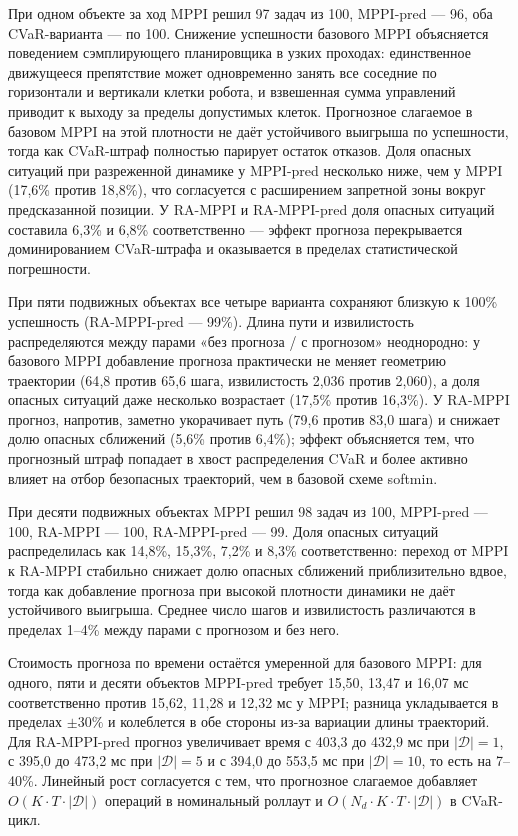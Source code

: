 \documentclass[a4paper,12pt]{extarticle}
\begin{document}
    При одном объекте за ход MPPI решил 97 задач из 100, MPPI-pred --- 96, оба CVaR-варианта
    --- по 100. Снижение успешности базового MPPI объясняется поведением сэмплирующего
    планировщика в узких проходах: единственное движущееся препятствие может одновременно занять все
    соседние по горизонтали и вертикали клетки робота, и взвешенная сумма управлений приводит к
    выходу за пределы допустимых клеток. Прогнозное слагаемое в базовом MPPI на этой
    плотности не даёт устойчивого выигрыша по успешности, тогда как CVaR-штраф полностью
    парирует остаток отказов. Доля опасных ситуаций при разреженной динамике
    у MPPI-pred несколько ниже, чем у MPPI (17{,}6\% против 18{,}8\%), что согласуется
    с расширением запретной зоны вокруг предсказанной позиции. У RA-MPPI и RA-MPPI-pred
    доля опасных ситуаций составила 6{,}3\% и 6{,}8\% соответственно --- эффект прогноза
    перекрывается доминированием CVaR-штрафа и оказывается в пределах статистической погрешности.

    При пяти подвижных объектах все четыре варианта сохраняют близкую к 100\% успешность
    (RA-MPPI-pred --- 99\%). Длина пути и извилистость распределяются между парами
    «без прогноза / с прогнозом» неоднородно: у базового MPPI добавление прогноза
    практически не меняет геометрию траектории (64{,}8 против 65{,}6 шага, извилистость
    2{,}036 против 2{,}060), а доля опасных ситуаций даже несколько возрастает
    (17{,}5\% против 16{,}3\%). У RA-MPPI прогноз, напротив, заметно укорачивает путь
    (79{,}6 против 83{,}0 шага) и снижает долю опасных сближений (5{,}6\% против 6{,}4\%);
    эффект объясняется тем, что прогнозный штраф попадает в хвост распределения CVaR
    и более активно влияет на отбор безопасных траекторий, чем в базовой схеме softmin.

    При десяти подвижных объектах MPPI решил 98 задач из 100, MPPI-pred --- 100,
    RA-MPPI --- 100, RA-MPPI-pred --- 99. Доля опасных ситуаций распределилась как
    14{,}8\%, 15{,}3\%, 7{,}2\% и 8{,}3\% соответственно: переход от MPPI к RA-MPPI
    стабильно снижает долю опасных сближений приблизительно вдвое, тогда как добавление
    прогноза при высокой плотности динамики не даёт устойчивого выигрыша.
    Среднее число шагов и извилистость различаются в пределах 1--4\% между парами
    с прогнозом и без него.

    Стоимость прогноза по времени остаётся умеренной для базового MPPI: для одного,
    пяти и десяти объектов MPPI-pred требует 15{,}50, 13{,}47 и 16{,}07 мс соответственно
    против 15{,}62, 11{,}28 и 12{,}32 мс у MPPI; разница укладывается в пределах
    $\pm 30\%$ и колеблется в обе стороны из-за вариации длины траекторий.
    Для RA-MPPI-pred прогноз увеличивает время с 403{,}3 до 432{,}9 мс при $|\mathcal{D}| = 1$,
    с 395{,}0 до 473{,}2 мс при $|\mathcal{D}| = 5$ и с 394{,}0 до 553{,}5 мс при $|\mathcal{D}| = 10$,
    то есть на 7--40\%. Линейный рост согласуется с тем, что прогнозное слагаемое
    добавляет $O(K \cdot T \cdot |\mathcal{D}|)$ операций в номинальный роллаут
    и $O(N_d \cdot K \cdot T \cdot |\mathcal{D}|)$ в CVaR-цикл.
\end{document}

